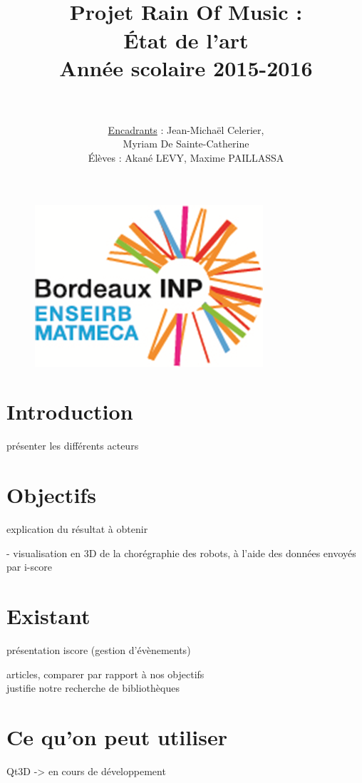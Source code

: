 \documentclass[paper=a4,12pt]{article}
\title{
  \horrule{1.5pt} \\[0.5cm]	
  \Huge \textbf{Projet Rain Of Music : \\ État de l'art} \\ [20pt]
    \LARGE Année scolaire 2015-2016 \\ 
  \horrule{1.5pt} \\[0.5cm]
}
\author{						
    \LARGE \underline{Encadrants} : Jean-Michaël Celerier, \\
   					\LARGE	\hspace{5cm} Myriam De Sainte-Catherine\\			
   	\vspace{1cm} 
   	\normalfont
   	\LARGE Élèves :  Akané LEVY, Maxime PAILLASSA    
}
\date{}
\numberwithin{equation}{section}		%
\numberwithin{figure}{section}			%
\numberwithin{table}{section}				%
\begin{document}
\graphicspath{{./imgs/}{.}}
\maketitle

\begin{figure}[H]
  \centering\includegraphics[scale=1.2]{logo_enseirb.png}
\end{figure}

\newpage

\tableofcontents

\newpage
\normalsize

\section{Introduction}
présenter les différents acteurs


\section{Objectifs}
explication du résultat à obtenir

- visualisation en 3D de la chorégraphie des robots, à l'aide des données envoyés par i-score 

\section{Existant}
présentation iscore (gestion d'évènements)



articles, comparer par rapport à nos objectifs \\
justifie notre recherche de bibliothèques



\section{Ce qu'on peut utiliser}
Qt3D -> en cours de développement
\end{document}
